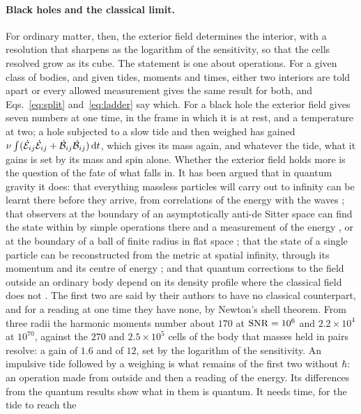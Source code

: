 \paragraph{Black holes and the classical limit.} For ordinary matter, then,
the exterior field determines the interior, with a resolution that sharpens as the
logarithm of the sensitivity, so that the cells resolved grow as its cube. The statement is one about operations. For a
given class of bodies, and given tides, moments and times, either two
interiors are told apart or every allowed measurement gives the same result
for both, and Eqs.~\eqref{eq:split} and~\eqref{eq:ladder} say which. For a black hole the exterior field gives seven
numbers at one time, in the frame in which it is at rest, and a temperature at
two; a hole subjected to a slow tide and then weighed has gained
$\nu\int(\dot{\mathcal{E}}_{ij}\dot{\mathcal{E}}_{ij} + \dot{\mathcal{B}}_{ij}\dot{\mathcal{B}}_{ij})\,\mathrm{d} t$,
which gives its mass again, and whatever the tide, what it gains is set by its
mass and spin alone. Whether the exterior field holds more is the question of the fate of
what falls in. It has been argued that in quantum gravity it does:
that everything massless particles will carry out to infinity can be learnt
there before they arrive, from correlations of the energy with the waves
\cite{LaddhaEtAl2021}; that observers at the boundary of an asymptotically
anti-de Sitter space can find the state within by simple operations there and
a measurement of the energy \cite{ChowdhuryPapadoulakiRaju2021}, or at the
boundary of a ball of finite radius in flat space \cite{GaddamH2024}; that the
state of a single particle can be reconstructed from the metric at spatial
infinity, through its momentum and its centre of energy \cite{Donnelly2018};
and that
quantum corrections to the field outside an ordinary body depend on its
density profile where the classical field does not \cite{CalmetEtAl2022}.
The first two are said by their authors to have no classical counterpart, and
for a reading at one time they have none, by Newton's shell theorem. From three radii the harmonic moments
number about $170$ at $\mathrm{SNR} = 10^6$ and $2.2\times10^4$ at $10^{70}$, against the
$270$ and $2.5\times10^5$ cells of the body that masses held in pairs resolve: a
gain of $1.6$ and of $12$, set by the logarithm of the sensitivity.
An impulsive tide followed by a weighing is what remains of the first two
without $\hbar$:
an operation made from
outside and then a reading of the energy. Its differences from the quantum
results show what in them is quantum. It needs time, for the tide to reach the
